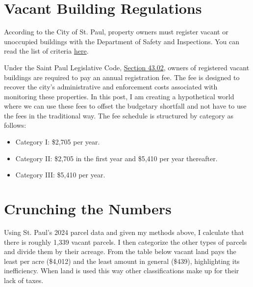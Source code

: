 \documentclass[12pt]{article}
\begin{document}
\section*{Vacant Building Regulations}

According to the City of St. Paul, property owners must register vacant or unoccupied buildings with the Department of Safety and Inspections. You can read the list of criteria \href{https://www.stpaul.gov/departments/safety-inspections/rent-buy-sell-property/vacant-buildings/vacant-building-program}{here}.

Under the Saint Paul Legislative Code, \href{https://library.municode.com/mn/st._paul/codes/code_of_ordinances?nodeId=PTIILECO_TITVIBUHO_CH43VABU_S43.03VABURE}{Section 43.02}, owners of registered vacant buildings are required to pay an annual registration fee. The fee is designed to recover the city’s administrative and enforcement costs associated with monitoring these properties. In this post, I am creating a hypothetical world where we can use these fees to offset the budgetary shortfall and not have to use the fees in the traditional way. The fee schedule is structured by category as follows:

\begin{itemize}
    \item Category I: \$2,705 per year.
    \item Category II: \$2,705 in the first year and \$5,410 per year thereafter.
    \item Category III: \$5,410 per year.
\end{itemize}

\section*{Crunching the Numbers}

Using St. Paul’s 2024 parcel data and given my methods above, I calculate that there is roughly 1,339 vacant parcels. I then categorize the other types of parcels and divide them by their acreage. From the table below vacant land pays the least per acre (\$4,012) and the least amount in general (\$439), highlighting its inefficiency. When land is used this way other classifications make up for their lack of taxes.
\end{document}
